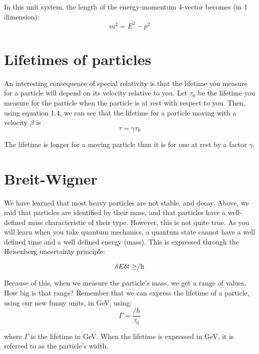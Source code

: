 In this unit system, the length of the energy-momentum 4-vector becomes (in 1 dimension):
\begin{equation}
	  m^2 = E^2 - p^2
\end{equation}  	 


\section{Lifetimes of particles}

An interesting consequence of special relativity is that the lifetime you measure for a particle will depend on its velocity relative to you.  Let $\tau _0$  be the lifetime you measure for the particle when the particle is at rest with respect to you.  Then, using equation 1.4, we can see that the lifetime for a particle moving with a velocity $\beta$  is
\begin{equation}
	 \tau  = \gamma \tau _0
\end{equation}  	 

The lifetime is longer for a moving particle than it is for one at rest by a factor $\gamma$.

\section{Breit-Wigner}

We have learned that most heavy particles are not stable, and decay.  Above, we said that particles are identified by their mass, and that particles have a well-defined mass characteristic of their type.  However, this is not quite true.  As you will learn when you take quantum mechanics, a quantum state cannot have a well defined time and a well defined energy (mass).  This is expressed through the Heisenberg uncertainty principle:

\begin{equation}
	 \delta E \delta t   \ge $\slash h$
\end{equation} 

Because of this, when we measure the particle’s mass, we get a range of values.  How big is that range?  Remember that we can express the lifetime of a particle, using our new funny units, in GeV, using:
 \begin{equation}
	 \Gamma =   \frac{\slash h}{\tau _0}
\end{equation} 
	  

where  $\Gamma$ is the lifetime in GeV.  When the lifetime is expressed in GeV,  it is referred to as the particle’s width.

